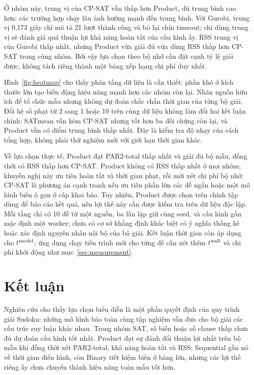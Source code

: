 \documentclass[a4paper]{cas-sc}
\begin{document}
Ở nhóm này, trung vị của CP-SAT vẫn thấp hơn Product, dù trung bình cao hơn: các trường hợp chạy lâu ảnh hưởng mạnh đến trung bình. Với Gurobi, trung vị 0,173 giây chỉ mô tả 21 lượt thành công và bỏ lại chín timeout; chỉ dùng trung vị sẽ đánh giá quá thuận lợi khả năng hoàn tất của cấu hình ấy. RSS trung vị của Gurobi thấp nhất, nhưng Product vừa giải đủ vừa dùng RSS thấp hơn CP-SAT trong cùng nhóm. Bởi vậy lựa chọn theo bộ nhớ cần đặt cạnh tỷ lệ giải được, không tách riêng thành một bảng xếp hạng chi phí duy nhất.
\begin{reportfigure}
\centering
\caption{PAR2-total của Product và bốn đối chứng theo kích thước và nhóm độ khó. Mỗi ô gồm 30 lượt; màu dùng thang logarit (độ đậm biến đổi theo logarit của giá trị) để hiển thị cả các lượt rất ngắn và các nhóm bị ảnh hưởng bởi timeout.}
\label{fig:heatmap}
\end{reportfigure}
Hình~\ref{fig:heatmap} cho thấy phân tầng dữ liệu là cần thiết: phần khó ở kích thước lớn tạo biến động hiệu năng mạnh hơn các nhóm còn lại. Nhãn nguồn hữu ích để tổ chức mẫu nhưng không dự đoán chắc chắn thời gian của từng bộ giải. Đổi hệ số phạt từ 2 sang 1 hoặc 10 trên cùng dữ liệu không làm đổi hai kết luận chính: SATmean vẫn kém CP-SAT nhưng tốt hơn ba đối chứng còn lại, và Product vẫn có điểm trung bình thấp nhất. Đây là kiểm tra độ nhạy của cách tổng hợp, không phải thử nghiệm mới với giới hạn thời gian khác.

Về lựa chọn thực tế, Product đạt PAR2-total thấp nhất và giải đủ bộ mẫu, đồng thời có RSS thấp hơn CP-SAT. Product không có RSS thấp nhất ở mọi nhóm; khuyến nghị này ưu tiên hoàn tất và thời gian phạt, rồi mới xét chi phí bộ nhớ; CP-SAT là phương án cạnh tranh nếu ưu tiên phần lớn các đề ngắn hoặc một mô hình biến ô gọn ở cấp khai báo. Tuy nhiên, Product được chọn trên chính tập dùng để báo cáo kết quả, nên lợi thế này cần được kiểm tra trên dữ liệu độc lập. Mỗi tầng chỉ có 10 đề từ một nguồn, ba lần lặp giữ cùng seed, và cấu hình gần mặc định một worker; chưa có cơ sở khẳng định khác biệt có ý nghĩa thống kê hoặc xác định nguyên nhân nội bộ của bộ giải. Kết luận thời gian còn áp dụng cho $t^{\rm model}$; ứng dụng chạy tiến trình mới cho từng đề cần xét thêm $t^{\rm wall}$ và chi phí khởi động như mục~\ref{sec:measurement}.

\section{Kết luận}
Nghiên cứu cho thấy lựa chọn biểu diễn là một phần quyết định của quy trình giải Sudoku: những mô hình bảo toàn cùng tập nghiệm vẫn đưa cho bộ giải các cấu trúc suy luận khác nhau. Trong nhóm SAT, số biến hoặc số clause thấp chưa đủ dự đoán cấu hình tốt nhất. Product đạt sự đánh đổi thuận lợi nhất trên bộ mẫu khi đồng thời xét PAR2-total, khả năng hoàn tất và RSS; Sequential gần nó về thời gian điển hình, còn Binary tiết kiệm biến ở bảng lớn, nhưng các lợi thế riêng ấy chưa chuyển thành hiệu năng toàn mẫu tốt hơn.
\end{document}
